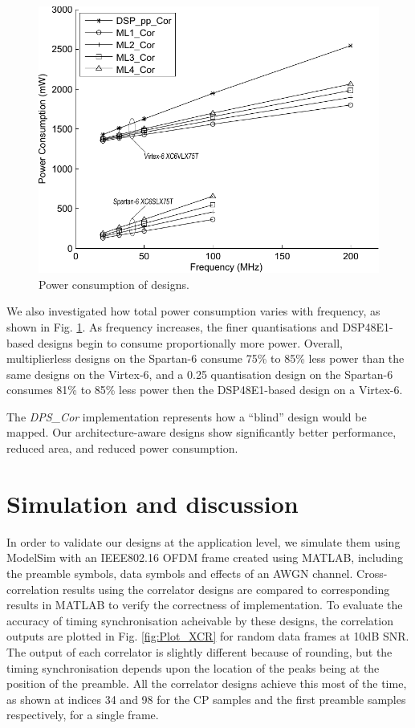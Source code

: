 \begin{figure}
	\centerline{\includegraphics [width=0.9\columnwidth] {figures/Plot_PWR.pdf} }
	\caption{Power consumption of designs.}
	\label{fig:Plot_PWR}
\end{figure}

We also investigated how total power consumption varies with frequency, as shown in Fig. \ref{fig:Plot_PWR}.
As frequency increases, the finer quantisations and DSP48E1-based designs begin to consume proportionally more power.
Overall, multiplierless designs on the Spartan-6 consume 75\% to 85\% less power than the same designs on the Virtex-6, and a 0.25 quantisation design on the Spartan-6 consumes 81\% to 85\% less power then the DSP48E1-based design on a Virtex-6.

The \emph{DPS\_Cor} implementation represents how a ``blind'' design would be mapped. Our architecture-aware designs show significantly better performance, reduced area, and reduced power consumption.

\section{Simulation and discussion}
In order to validate our designs at the application level, we simulate them using ModelSim with an IEEE802.16 OFDM frame created using MATLAB, including the preamble symbols, data symbols and effects of an AWGN channel. 
Cross-correlation results using the correlator designs are compared to corresponding results in MATLAB to verify the correctness of implementation. 
To evaluate the accuracy of timing synchronisation acheivable by these designs, the correlation outputs are plotted in Fig. \ref{fig:Plot_XCR} for random data frames at 10{\thinspace}dB SNR. 
The output of each correlator is slightly different because of rounding, but the timing synchronisation depends upon the location of the peaks being at the  position of the preamble.
All the correlator designs achieve this most of the time, as shown at indices 34 and 98 for the CP samples and the first preamble samples respectively, for a single frame. 
 
